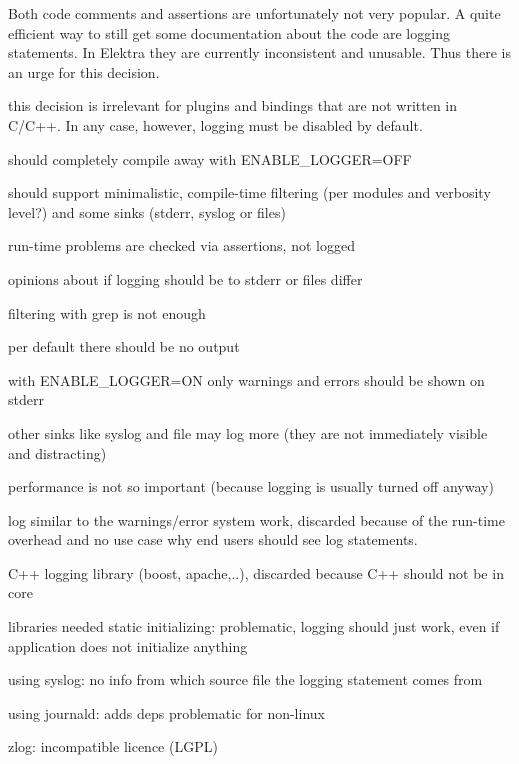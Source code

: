 Both code comments and assertions are unfortunately not very popular. A quite efficient way to still get some documentation about the code are logging statements. In Elektra they are currently inconsistent and unusable. Thus there is an urge for this decision.


\begin{DoxyItemize}
\item this decision is irrelevant for plugins and bindings that are not written in C/\+C++. In any case, however, logging must be disabled by default.
\item should completely compile away with E\+N\+A\+B\+L\+E\+\_\+\+L\+O\+G\+G\+ER=O\+FF
\item should support minimalistic, compile-\/time filtering (per modules and verbosity level?) and some sinks (stderr, syslog or files)
\end{DoxyItemize}


\begin{DoxyItemize}
\item run-\/time problems are checked via assertions, not logged
\item opinions about if logging should be to stderr or files differ
\item filtering with grep is not enough
\item per default there should be no output
\item with E\+N\+A\+B\+L\+E\+\_\+\+L\+O\+G\+G\+ER=ON only warnings and errors should be shown on stderr
\item other sinks like syslog and file may log more (they are not immediately visible and distracting)
\item performance is not so important (because logging is usually turned off anyway)
\end{DoxyItemize}


\begin{DoxyItemize}
\item log similar to the warnings/error system work, discarded because of the run-\/time overhead and no use case why end users should see log statements.
\item C++ logging library (boost, apache,..), discarded because C++ should not be in core
\item libraries needed static initializing\+: problematic, logging should just work, even if application does not initialize anything
\item using syslog\+: no info from which source file the logging statement comes from
\item using journald\+: adds deps problematic for non-\/linux
\item zlog\+: incompatible licence (L\+G\+PL)
\end{DoxyItemize}

